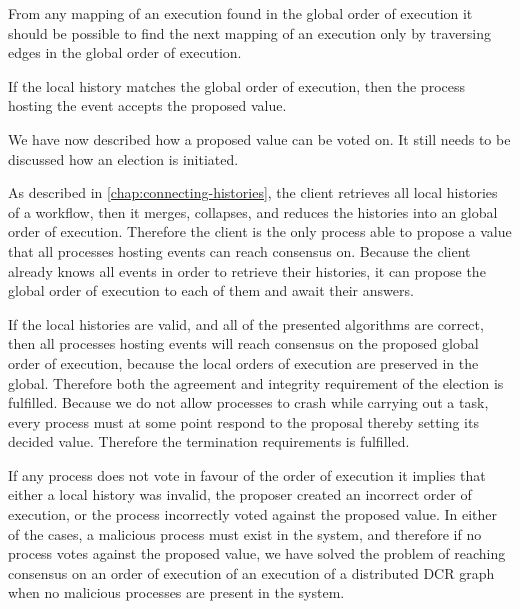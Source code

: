 	\newpar From any mapping of an execution found in the global order of execution it should be possible to find the next mapping of an execution only by traversing edges in the global order of execution.
	
	If the local history matches the global order of execution, then the process hosting the event accepts the proposed value.
	
	\newpar We have now described how a proposed value can be voted on. It still needs to be discussed how an election is initiated.
	
	\newpar As described in \autoref{chap:connecting-histories}, the client retrieves all local histories of a workflow, then it merges, collapses, and reduces the histories into an global order of execution. Therefore the client is the only process able to propose a value that all processes hosting events can reach consensus on. Because the client already knows all events in order to retrieve their histories, it can propose the global order of execution to each of them and await their answers.
	
	\newpar If the local histories are valid, and all of the presented algorithms are correct, then all processes hosting events will reach consensus on the proposed global order of execution, because the local orders of execution are preserved in the global. Therefore both the agreement and integrity requirement of the election is fulfilled. Because we do not allow processes to crash while carrying out a task, every process must at some point respond to the proposal thereby setting its decided value. Therefore the termination requirements is fulfilled.
	
	\newpar If any process does not vote in favour of the order of execution it implies that either a local history was invalid, the proposer created an incorrect order of execution, or the process incorrectly voted against the proposed value. In either of the cases, a malicious process must exist in the system, and therefore if no process votes against the proposed value, we have solved the problem of reaching consensus on an order of execution of an execution of a distributed DCR graph when no malicious processes are present in the system.